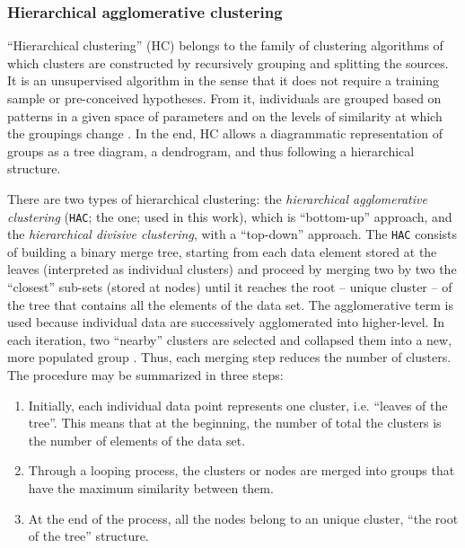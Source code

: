 \documentclass[fleqn,usenatbib]{mnras}
\newcommand{\comment}[1]{\textcolor{red}{#1}}
\begin{document}
\subsubsection{Hierarchical agglomerative clustering}
\label{sec:Hierar}

``Hierarchical clustering'' (HC) belongs to the family of clustering algorithms of which clusters are constructed by recursively grouping and splitting the sources. 
It is an unsupervised algorithm in the sense that it does not require a training sample or pre-conceived hypotheses. 
From it, individuals are grouped 
based on patterns in a given space of parameters and on the levels of similarity
at which the groupings change \citep{Jain:1999}. 
In the end, HC allows a diagrammatic representation of groups as  a tree diagram, a dendrogram, and thus following a hierarchical structure.  

There are two types of hierarchical
clustering: 
the \textit{hierarchical agglomerative clustering} (\texttt{HAC}; the one; used in this work), 
which is ``bottom-up'' approach, and the \textit{hierarchical divisive clustering}, 
with a ``top-down'' approach. 
The \texttt{HAC} consists of building a binary merge tree, starting from 
each data element stored at the leaves (interpreted as individual clusters)
and proceed by merging two by two the ``closest'' sub-sets (stored at nodes)
until it reaches the root -- unique cluster -- of the tree that contains all the elements
of the data set. The agglomerative term is used because individual data
 are successively agglomerated into higher-level. In each iteration, two ``nearby'' clusters
are selected 
and collapsed them into a new, more populated group \citep{Mann:2013, Aggarwal:2015}.
 Thus, each merging step reduces the number of clusters. 
The procedure may be summarized in three steps:

\begin{enumerate}
\item Initially, each individual data point represents one cluster, i.e. ``leaves of the tree''. 
This means that at the beginning, the number of total the clusters is the number 
of elements of the data set.
\item Through a looping process, the clusters or nodes are merged into groups that 
have the maximum similarity between them.
\item At the end of the process, all the nodes belong to an unique cluster, ``the root of the tree'' structure.
 \end{enumerate}
\end{document}
